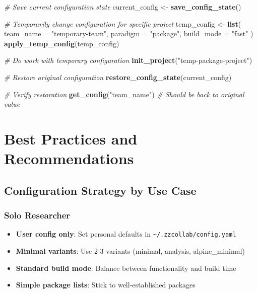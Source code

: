 \documentclass[
]{article}
\newenvironment{Shaded}{\begin{snugshade}}{\end{snugshade}}
\newcommand{\AttributeTok}[1]{\textcolor[rgb]{0.13,0.29,0.53}{#1}}
\newcommand{\CommentTok}[1]{\textcolor[rgb]{0.56,0.35,0.01}{\textit{#1}}}
\newcommand{\FunctionTok}[1]{\textcolor[rgb]{0.13,0.29,0.53}{\textbf{#1}}}
\newcommand{\NormalTok}[1]{#1}
\newcommand{\OtherTok}[1]{\textcolor[rgb]{0.56,0.35,0.01}{#1}}
\newcommand{\StringTok}[1]{\textcolor[rgb]{0.31,0.60,0.02}{#1}}
\providecommand{\tightlist}{%
  \setlength{\itemsep}{0pt}\setlength{\parskip}{0pt}}
\begin{document}
\begin{Shaded}
\begin{Highlighting}[]
\CommentTok{\# Save current configuration state}
\NormalTok{current\_config }\OtherTok{\textless{}{-}} \FunctionTok{save\_config\_state}\NormalTok{()}

\CommentTok{\# Temporarily change configuration for specific project}
\NormalTok{temp\_config }\OtherTok{\textless{}{-}} \FunctionTok{list}\NormalTok{(}
  \AttributeTok{team\_name =} \StringTok{"temporary{-}team"}\NormalTok{,}
  \AttributeTok{paradigm =} \StringTok{"package"}\NormalTok{,}
  \AttributeTok{build\_mode =} \StringTok{"fast"}
\NormalTok{)}
\FunctionTok{apply\_temp\_config}\NormalTok{(temp\_config)}

\CommentTok{\# Do work with temporary configuration}
\FunctionTok{init\_project}\NormalTok{(}\StringTok{"temp{-}package{-}project"}\NormalTok{)}

\CommentTok{\# Restore original configuration}
\FunctionTok{restore\_config\_state}\NormalTok{(current\_config)}

\CommentTok{\# Verify restoration}
\FunctionTok{get\_config}\NormalTok{(}\StringTok{"team\_name"}\NormalTok{)  }\CommentTok{\# Should be back to original value}
\end{Highlighting}
\end{Shaded}

\section{Best Practices and
Recommendations}\label{best-practices-and-recommendations}

\subsection{Configuration Strategy by Use
Case}\label{configuration-strategy-by-use-case}

\subsubsection{Solo Researcher}\label{solo-researcher}

\begin{itemize}
\tightlist
\item
  \textbf{User config only}: Set personal defaults in
  \texttt{\textasciitilde{}/.zzcollab/config.yaml}
\item
  \textbf{Minimal variants}: Use 2-3 variants (minimal, analysis,
  alpine\_minimal)
\item
  \textbf{Standard build mode}: Balance between functionality and build
  time
\item
  \textbf{Simple package lists}: Stick to well-established packages
\end{itemize}
\end{document}
